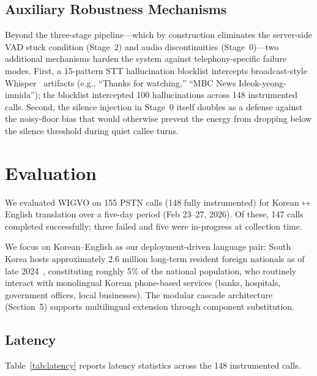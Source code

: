 \documentclass[11pt]{article}
\begin{document}
\subsection{Auxiliary Robustness Mechanisms}

Beyond the three-stage pipeline---which by construction eliminates the server-side VAD stuck condition (Stage~2) and audio discontinuities (Stage~0)---two additional mechanisms harden the system against telephony-specific failure modes. First, a 15-pattern STT hallucination blocklist intercepts broadcast-style Whisper~\citep{whisper_radford_2023} artifacts (e.g., ``Thanks for watching,'' ``MBC News Ideok-yeong-imnida''); the blocklist intercepted 100 hallucinations across 148 instrumented calls. Second, the silence injection in Stage~0 itself doubles as a defense against the noisy-floor bias that would otherwise prevent the energy from dropping below the silence threshold during quiet callee turns.

\section{Evaluation}
\label{sec:evaluation}

We evaluated WIGVO on 155 PSTN calls (148 fully instrumented) for Korean$\leftrightarrow$English translation over a five-day period (Feb 23--27, 2026). Of these, 147 calls completed successfully; three failed and five were in-progress at collection time.

We focus on Korean--English as our deployment-driven language
pair: South Korea hosts approximately 2.6 million long-term
resident foreign nationals as of late 2024~\citep{moisKoreaForeignResidents2024},
constituting roughly 5\% of the national population, who
routinely interact with monolingual Korean phone-based services
(banks, hospitals, government offices, local businesses).
The modular cascade architecture (Section~5) supports
multilingual extension through component substitution.

\subsection{Latency}

Table~\ref{tab:latency} reports latency statistics across the 148 instrumented calls.
\end{document}
